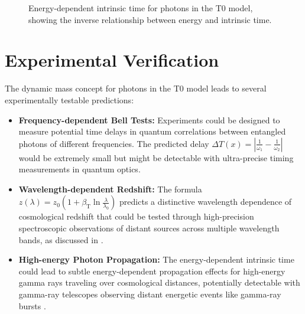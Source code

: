 \documentclass[12pt,a4paper]{article}
\newcommand{\Tfield}{T(x)}
\newcommand{\betaT}{\beta_{\text{T}}}
\begin{document}
	\begin{figure}[h]
		\centering
		\caption{Energy-dependent intrinsic time for photons in the T0 model, showing the inverse relationship between energy and intrinsic time.}
		\label{fig:energy_time}
	\end{figure}
	
	\section{Experimental Verification}
	The dynamic mass concept for photons in the T0 model leads to several experimentally testable predictions:
	
	\begin{itemize}
		\item \textbf{Frequency-dependent Bell Tests:} Experiments could be designed to measure potential time delays in quantum correlations between entangled photons of different frequencies. The predicted delay \(\Delta \Tfield = \left|\frac{1}{\omega_1} - \frac{1}{\omega_2}\right|\) would be extremely small but might be detectable with ultra-precise timing measurements in quantum optics.
		
		\item \textbf{Wavelength-dependent Redshift:} The formula \(z(\lambda) = z_0 \left(1 + \betaT \ln\frac{\lambda}{\lambda_0}\right)\) predicts a distinctive wavelength dependence of cosmological redshift that could be tested through high-precision spectroscopic observations of distant sources across multiple wavelength bands, as discussed in \cite{pascher_messdifferenzen_2025}.
		
		\item \textbf{High-energy Photon Propagation:} The energy-dependent intrinsic time could lead to subtle energy-dependent propagation effects for high-energy gamma rays traveling over cosmological distances, potentially detectable with gamma-ray telescopes observing distant energetic events like gamma-ray bursts \cite{pascher_galaxies_2025}.
	\end{itemize}
	
\end{document}
